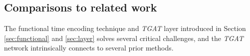 \documentclass{article} %
\newcommand{\hbf}{\mathbf{h}}
\begin{document}





\subsection{Comparisons to related work}
\label{sec:connection}

The functional time encoding technique and \textsl{TGAT} layer introduced in Section \ref{sec:functional} and \ref{sec:layer} solves several critical challenges, and the \textsl{TGAT} network intrinsically connects to several prior methods.
\end{document}
